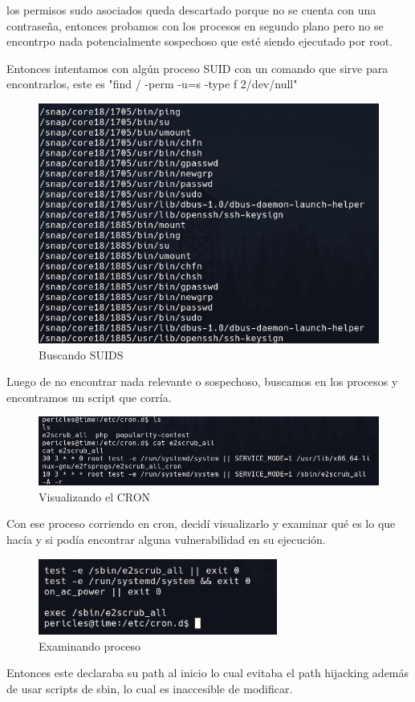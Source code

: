 \documentclass{article}
\begin{document}
los permisos sudo asociados queda descartado porque no se cuenta con una contraseña, entonces probamos con los procesos en segundo plano pero no se encontrpo nada potencialmente sospechoso que esté siendo ejecutado por root.

Entonces intentamos con algún proceso SUID con un comando que sirve para encontrarlos, este es "find / -perm -u=s -type f 2\>/dev/null"

\begin{figure}[H]
	\center
	\includegraphics[width=\textwidth]{images/time/perms.png}
	\caption{Buscando SUIDS}
\end{figure}

Luego de no encontrar nada relevante o sospechoso, buscamos en los procesos y encontramos un script que corría.

\begin{figure}[H]
	\center
	\includegraphics[width=\textwidth]{images/time/cron.png}
	\caption{Visualizando el CRON}
\end{figure}

Con ese proceso corriendo en cron, decidí visualizarlo y examinar qué es lo que hacía y si podía encontrar alguna vulnerabilidad en su ejecución.
\begin{figure}[H]
	\center
	\includegraphics[width=0.7\textwidth]{images/time/proceso_cron.png}
	\caption{Examinando proceso}
\end{figure}
Entonces este declaraba su path al inicio lo cual evitaba el path hijacking además de usar scripts de sbin, lo cual es inaccesible de modificar.
\end{document}
